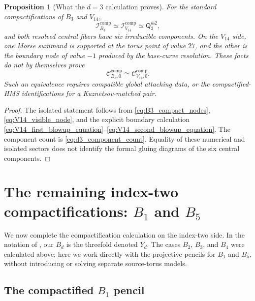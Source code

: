 \documentclass[11pt]{amsart}
\newtheorem{proposition}[theorem]{Proposition}
\theoremstyle{definition}
\theoremstyle{remark}
\newcommand{\MorseCat}[1]{\mathsf{Q}_{#1}}
\newcommand{\CcompBthree}{\mathcal C^{\mathrm{comp}}_{B_3,0}}
\newcommand{\CcompVfourteen}{\mathcal C^{\mathrm{comp}}_{V_{14},0}}
\begin{document}
\begin{proposition}[What the $d=3$ calculation proves]
\label{prop:d3_compactified_comparison}
For the standard compactifications of $B_3$ and $V_{14}$,
\[
\mathcal I_{B_3}^{\mathrm{comp}}
\simeq
\mathcal I_{V_{14}}^{\mathrm{comp}}
\simeq
\MorseCat{3}^{\oplus2},
\]
and both resolved central fibers have six irreducible components.  On the
$V_{14}$ side, one Morse summand is supported at the torus point of value
$27$, and the other is the boundary node of value $-1$ produced by the
base-curve resolution.  These facts do not by themselves prove
\[
\CcompBthree\simeq\CcompVfourteen.
\]
Such an equivalence requires compatible global attaching data, or the
compactified-HMS identifications for a Kuznetsov-matched pair.
\end{proposition}

\begin{proof}
The isolated statement follows from
\eqref{eq:B3_compact_nodes}, \eqref{eq:V14_visible_node}, and the explicit
boundary calculation
\eqref{eq:V14_first_blowup_equation}--\eqref{eq:V14_second_blowup_equation}.
The component count is \eqref{eq:d3_component_count}.  Equality of these
numerical and isolated sectors does not identify the formal gluing diagrams
of the six central components.
\end{proof}

\section{The remaining index-two compactifications:
\texorpdfstring{$B_1$ and $B_5$}{B1 and B5}}
\label{sec:B1_B5_compactifications}

We now complete the compactification calculation on the index-two side.  In
the notation of \cite{Przyjalkowski2026}, our $B_d$ is the threefold denoted
$Y_d$.  The cases $B_2$, $B_3$, and $B_4$ were calculated above; here we work
directly with the projective pencils for $B_1$ and $B_5$, without introducing
or solving separate source-torus models.

\subsection{The compactified \texorpdfstring{$B_1$}{B1} pencil}
\end{document}
